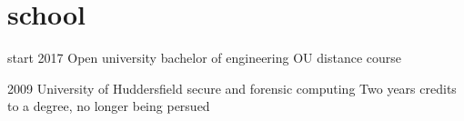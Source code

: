 \documentclass[]{friggeri-cv}
\begin{document}
\section{school}

\begin{entrylist}

\entry
{start 2017}
{Open university}
{bachelor of engineering}
{OU distance course}

\entry
{2009}
{University of Huddersfield}
{secure and forensic computing}
{Two years credits to a degree, no longer being persued}

\end{entrylist}
\end{document}
